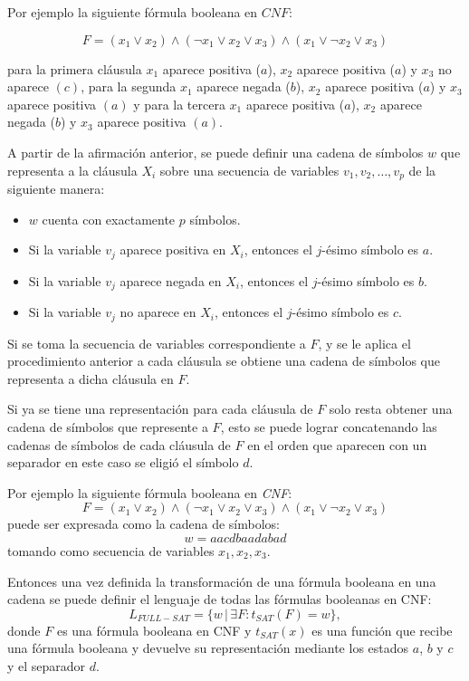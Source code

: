 Por ejemplo la siguiente fórmula booleana en $CNF$:

$$F=(x_1 \vee x_2) \wedge (\neg x_1 \vee x_2 \vee x_3) \wedge (x_1 \vee \neg x_2 \vee x_3)$$

para la primera cláusula $x_1$ aparece positiva ($a$), $x_2$ aparece positiva ($a$) y $x_3$ no aparece $(c)$, para la segunda
$x_1$ aparece negada ($b$), $x_2$ aparece positiva ($a$) y $x_3$ aparece positiva $(a)$ y para la tercera 
$x_1$ aparece positiva ($a$), $x_2$ aparece negada ($b$) y $x_3$ aparece positiva $(a)$.

A partir de la afirmación anterior, se puede definir una cadena de símbolos $w$ que representa a la cláusula $X_i$ sobre una secuencia de variables $v_1,v_2,\ldots,v_p$ de la siguiente manera:

\begin{itemize}
    \item $w$ cuenta con exactamente $p$ símbolos.
    \item Si la variable $v_j$ aparece positiva en $X_i$, entonces el $j$-ésimo símbolo es $a$.
    \item Si la variable $v_j$ aparece negada en $X_i$, entonces el $j$-ésimo símbolo es $b$.
    \item Si la variable $v_j$ no aparece en $X_i$, entonces el $j$-ésimo símbolo es $c$.
\end{itemize}
Si se toma la secuencia de variables correspondiente a $F$, y se le aplica el procedimiento anterior a cada cláusula
se obtiene una cadena de símbolos que representa a dicha cláusula en $F$.

Si ya se tiene una representación para cada cláusula de $F$ solo resta obtener una cadena de símbolos que represente a $F$,
esto se puede lograr concatenando las cadenas de símbolos de cada cláusula de $F$ en el orden que aparecen con un separador
en este caso se eligió el símbolo $d$.

Por ejemplo la siguiente fórmula booleana en \textit{CNF}:
$$F=(x_1 \vee x_2) \wedge (\neg x_1 \vee x_2 \vee x_3) \wedge (x_1 \vee \neg x_2 \vee x_3)$$
puede ser expresada como la cadena de símbolos:
$$w=aacdbaadabad$$
tomando como secuencia de variables $x_1, x_2, x_3$.

Entonces una vez definida la transformación de una fórmula booleana en una cadena se puede definir el lenguaje
de todas las fórmulas booleanas en CNF:
$$L_{FULL-SAT}=\{w\,|\,\exists F : t_{SAT}(F)=w\},$$
donde $F$ es una fórmula booleana en CNF y $t_{SAT}(x)$ es una función que recibe una fórmula booleana y devuelve
su representación mediante los estados $a$, $b$ y $c$ y el separador $d$.

